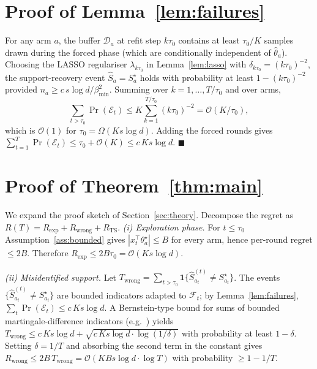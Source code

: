 \documentclass[journal,twoside,web]{ieeecolor}
\begin{document}
\section{Proof of Lemma~\ref{lem:failures}}\label{app:failures}

For any arm $a$, the buffer $\mathcal{D}_a$ at refit step $k\tau_0$ contains at least $\tau_0/K$ samples drawn during the forced phase (which are conditionally independent of $\hat\theta_a$). Choosing the LASSO regulariser $\lambda_{k\tau_0}$ in Lemma~\ref{lem:lasso} with $\delta_{k\tau_0} = (k\tau_0)^{-2}$, the support-recovery event $\hat{S}_a = S^\star_a$ holds with probability at least $1 - (k\tau_0)^{-2}$ provided $n_a \geq c\,s\log d/\beta_{\min}^2$. Summing over $k = 1, \dots, T/\tau_0$ and over arms,
\[
\sum_{t > \tau_0} \Pr(\mathcal{E}_t) \leq K \sum_{k=1}^{T/\tau_0} (k\tau_0)^{-2} = \mathcal{O}(K/\tau_0),
\]
which is $\mathcal{O}(1)$ for $\tau_0 = \Omega(Ks\log d)$. Adding the forced rounds gives $\sum_{t=1}^T \Pr(\mathcal{E}_t) \leq \tau_0 + \mathcal{O}(K) \leq c\,Ks\log d$. \hfill$\blacksquare$

\section{Proof of Theorem~\ref{thm:main}}\label{app:main}

We expand the proof sketch of Section~\ref{sec:theory}. Decompose the regret as
$
R(T) = R_{\mathrm{exp}} + R_{\mathrm{wrong}} + R_{\mathrm{TS}}.
$
\emph{(i) Exploration phase.} For $t \leq \tau_0$ Assumption~\ref{ass:bounded} gives $|x_t^\top \theta^\star_a| \leq B$ for every arm, hence per-round regret $\leq 2B$. Therefore $R_{\mathrm{exp}} \leq 2B\tau_0 = \mathcal{O}(Ks\log d)$.

\emph{(ii) Misidentified support.} Let $T_{\mathrm{wrong}} = \sum_{t > \tau_0} \mathbf{1}\{\hat{S}_{a_t}^{(t)} \neq S^\star_{a_t}\}$. The events $\{\hat{S}_{a_t}^{(t)} \neq S^\star_{a_t}\}$ are bounded indicators adapted to $\mathcal{F}_t$; by Lemma~\ref{lem:failures}, $\sum_t \Pr(\mathcal{E}_t) \leq c\,Ks\log d$. A Bernstein-type bound for sums of bounded martingale-difference indicators (e.g.~\cite[Sec.~A.7]{lattimore2020bandit}) yields $T_{\mathrm{wrong}} \leq c\,Ks\log d + \sqrt{c\,K s \log d \cdot \log(1/\delta)}$ with probability at least $1 - \delta$. Setting $\delta = 1/T$ and absorbing the second term in the constant gives $R_{\mathrm{wrong}} \leq 2B\,T_{\mathrm{wrong}} = \mathcal{O}(KBs\log d \cdot \log T)$ with probability $\geq 1 - 1/T$.
\end{document}
